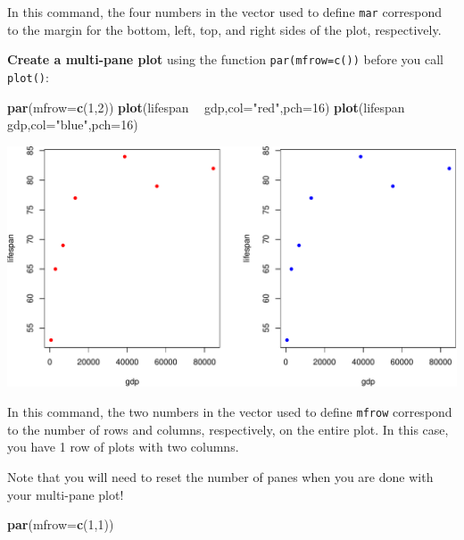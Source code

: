 \documentclass[
]{book}
\newenvironment{Shaded}{\begin{snugshade}}{\end{snugshade}}
\newcommand{\DataTypeTok}[1]{\textcolor[rgb]{0.13,0.29,0.53}{#1}}
\newcommand{\DecValTok}[1]{\textcolor[rgb]{0.00,0.00,0.81}{#1}}
\newcommand{\KeywordTok}[1]{\textcolor[rgb]{0.13,0.29,0.53}{\textbf{#1}}}
\newcommand{\NormalTok}[1]{#1}
\newcommand{\OperatorTok}[1]{\textcolor[rgb]{0.81,0.36,0.00}{\textbf{#1}}}
\newcommand{\StringTok}[1]{\textcolor[rgb]{0.31,0.60,0.02}{#1}}
\begin{document}
In this command, the four numbers in the vector used to define \texttt{mar} correspond to the margin for the bottom, left, top, and right sides of the plot, respectively.

\textbf{Create a multi-pane plot} using the function \texttt{par(mfrow=c())} before you call \texttt{plot()}:

\begin{Shaded}
\begin{Highlighting}[]
\KeywordTok{par}\NormalTok{(}\DataTypeTok{mfrow=}\KeywordTok{c}\NormalTok{(}\DecValTok{1}\NormalTok{,}\DecValTok{2}\NormalTok{))}
\KeywordTok{plot}\NormalTok{(lifespan }\OperatorTok{~}\StringTok{ }\NormalTok{gdp,}\DataTypeTok{col=}\StringTok{"red"}\NormalTok{,}\DataTypeTok{pch=}\DecValTok{16}\NormalTok{)}
\KeywordTok{plot}\NormalTok{(lifespan }\OperatorTok{~}\StringTok{ }\NormalTok{gdp,}\DataTypeTok{col=}\StringTok{"blue"}\NormalTok{,}\DataTypeTok{pch=}\DecValTok{16}\NormalTok{)}
\end{Highlighting}
\end{Shaded}

\includegraphics{figures/unnamed-chunk-111-1.pdf}

In this command, the two numbers in the vector used to define \texttt{mfrow} correspond to the number of rows and columns, respectively, on the entire plot. In this case, you have 1 row of plots with two columns.

Note that you will need to reset the number of panes when you are done with your multi-pane plot!

\begin{Shaded}
\begin{Highlighting}[]
\KeywordTok{par}\NormalTok{(}\DataTypeTok{mfrow=}\KeywordTok{c}\NormalTok{(}\DecValTok{1}\NormalTok{,}\DecValTok{1}\NormalTok{))}
\end{Highlighting}
\end{Shaded}
\end{document}
